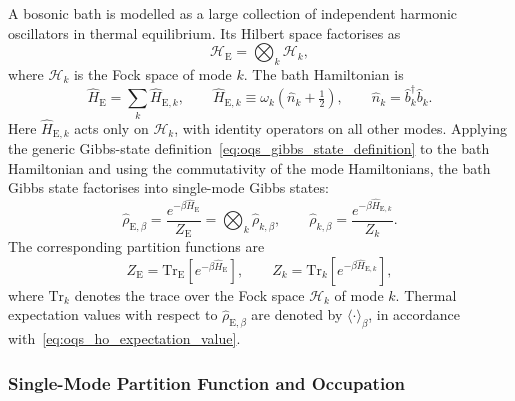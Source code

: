 A bosonic bath is modelled as a large collection of independent harmonic oscillators in thermal equilibrium. Its Hilbert space factorises as
\begin{equation*}
	\mathcal{H}_{\mathrm{E}} = \bigotimes_k \mathcal{H}_k,
\end{equation*}
where \(\mathcal{H}_k\) is the Fock space of mode \(k\). The bath Hamiltonian is
\begin{equation}
	\hat{H}_{\mathrm{E}} = \sum_k \hat{H}_{\mathrm{E},k},
	\qquad
	\hat{H}_{\mathrm{E},k} \equiv \omega_k \left(\hat{n}_k + \tfrac{1}{2}\right),
	\qquad
	\hat{n}_k = \hat{b}_k^{\dagger}\hat{b}_k.
	\label{eq:oqs_ho_bath_hamiltonian}
\end{equation}
Here \(\hat{H}_{\mathrm{E},k}\) acts only on \(\mathcal{H}_k\), with identity operators on all other modes. Applying the generic Gibbs-state definition~\autoref{eq:oqs_gibbs_state_definition} to the bath Hamiltonian and using the commutativity of the mode Hamiltonians, the bath Gibbs state factorises into single-mode Gibbs states:
\begin{equation}
	\hat{\rho}_{\mathrm{E},\beta}
	=
	\frac{e^{-\beta \hat{H}_{\mathrm{E}}}}{Z_{\mathrm{E}}}
	=
	\bigotimes_k \hat{\rho}_{k,\beta},
	\qquad
	\hat{\rho}_{k,\beta}
	=
	\frac{e^{-\beta \hat{H}_{\mathrm{E},k}}}{Z_k}.
	\label{eq:oqs_ho_bath_state_factorization}
\end{equation}
The corresponding partition functions are
\begin{equation*}
	Z_{\mathrm{E}}
	=
	\mathrm{Tr}_{\mathrm{E}}\!\left[e^{-\beta \hat{H}_{\mathrm{E}}}\right],
	\qquad
	Z_k
	=
	\mathrm{Tr}_k\!\left[e^{-\beta \hat{H}_{\mathrm{E},k}}\right],
\end{equation*}
where \(\mathrm{Tr}_k\) denotes the trace over the Fock space \(\mathcal{H}_k\) of mode \(k\).
Thermal expectation values with respect to \(\hat{\rho}_{\mathrm{E},\beta}\) are denoted by \(\langle \cdot \rangle_\beta\), in accordance with~\autoref{eq:oqs_ho_expectation_value}.

\subsubsection{Single-Mode Partition Function and Occupation}
\label{subsubsec:oqs_single_mode}

